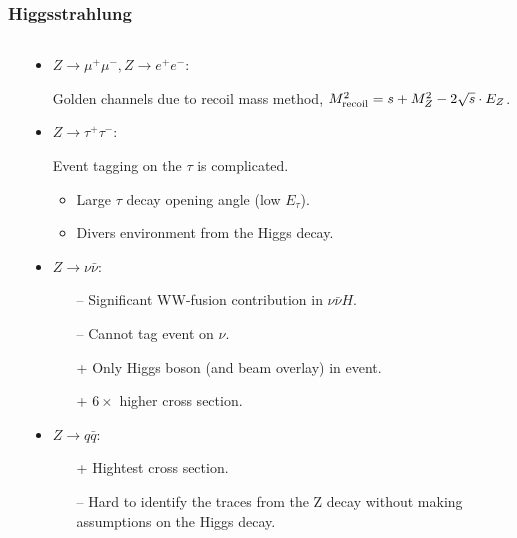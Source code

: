 \begin{frame}%
    \frametitle{Higgsstrahlung}
    \begin{columns}[c,onlytextwidth]
    \begin{column}{0.40\textwidth}
    \resizebox{\textwidth}{!}{
        
    }
    \end{column}
    \begin{column}{0.60\textwidth}
    \vspace{-1\baselineskip} %
    \begin{itemize}
        \item \textcolor{xemphcolor}{
            $Z \rightarrow \mu^+ \mu^-, Z \rightarrow e^+ e^-$}:

            Golden channels due to recoil mass method,
            $M_{\textnormal{recoil}}^2 = s + M_Z^2 - 2\sqrt{s} \cdot E_Z$.
        \item \textcolor{xemphcolor}{
            $Z \rightarrow \tau^+ \tau^-$}:

            Event tagging on the $\tau$ is complicated.
            \begin{itemize}
                \item Large $\tau$ decay opening angle (low $E_\tau$).
                \item Divers environment from the Higgs decay.
            \end{itemize}
        \item \textcolor{xemphcolor}{
            $Z \rightarrow \nu\bar{\nu}$}:
            \begin{itemize}
                \item[--] Significant WW-fusion contribution in $\nu\bar{\nu}H$.
                \item[--] Cannot tag event on $\nu$.
                \item[+]  Only Higgs boson (and beam overlay) in event.
                \item[+]  $6\times$ higher cross section.
            \end{itemize}

        \item \textcolor{xemphcolor}{
            $Z \rightarrow q \bar{q}$}:
            \begin{itemize}
                \item[+]  Hightest cross section.
                \item[--] Hard to identify the traces from the Z decay
                    without making assumptions on the Higgs decay.
            \end{itemize}
    \end{itemize}
    \end{column}
    \end{columns}
    \end{frame}
